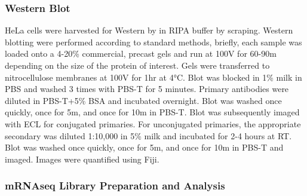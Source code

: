 \documentclass[12pt,oneside]{reedthesis}
\begin{document}
\hypertarget{western-blot}{%
\subsubsection{Western Blot}\label{western-blot}}

HeLa cells were harvested for Western by in RIPA buffer by scraping. Western blotting were performed according to standard methods, briefly, each sample was loaded onto a 4-20\% commercial, precast gels and run at 100V for 60-90m depending on the size of the protein of interest. Gels were transferred to nitrocellulose membranes at 100V for 1hr at 4°C. Blot was blocked in 1\% milk in PBS and washed 3 times with PBS-T for 5 minutes. Primary antibodies were diluted in PBS-T+5\% BSA and incubated overnight. Blot was washed once quickly, once for 5m, and once for 10m in PBS-T. Blot was subsequently imaged with ECL for conjugated primaries. For unconjugated primaries, the appropriate secondary was diluted 1:10,000 in 5\% milk and incubated for 2-4 hours at RT. Blot was washed once quickly, once for 5m, and once for 10m in PBS-T and imaged. Images were quantified using Fiji.

\hypertarget{mrnaseq-library-preparation-and-analysis}{%
\subsubsection{mRNAseq Library Preparation and Analysis}\label{mrnaseq-library-preparation-and-analysis}}
\end{document}
